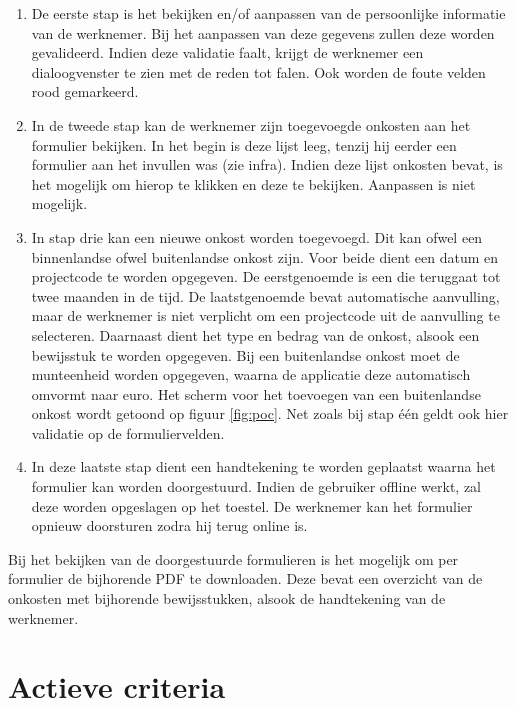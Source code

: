 \begin{enumerate}
\item De eerste stap is het bekijken en/of aanpassen van de persoonlijke informatie van de werknemer.
Bij het aanpassen van deze gegevens zullen deze worden gevalideerd.
Indien deze validatie faalt, krijgt de werknemer een dialoogvenster te zien met de reden tot falen.
Ook worden de foute velden rood gemarkeerd.

\item In de tweede stap kan de werknemer zijn toegevoegde onkosten aan het formulier bekijken.
In het begin is deze lijst leeg, tenzij hij eerder een formulier aan het invullen was (zie infra).
Indien deze lijst onkosten bevat, is het mogelijk om hierop te klikken en deze te bekijken.
Aanpassen is niet mogelijk.

\item In stap drie kan een nieuwe onkost worden toegevoegd.
Dit kan ofwel een binnenlandse ofwel buitenlandse onkost zijn.
Voor beide dient een datum en projectcode te worden opgegeven.
De eerstgenoemde is een  die teruggaat tot twee maanden in de tijd.
De laatstgenoemde bevat automatische aanvulling, maar de werknemer is niet verplicht om een projectcode uit de aanvulling te selecteren.
Daarnaast dient het type en bedrag van de onkost, alsook een bewijsstuk te worden opgegeven.
Bij een buitenlandse onkost moet de munteenheid worden opgegeven, waarna de applicatie deze automatisch omvormt naar euro.
Het scherm voor het toevoegen van een buitenlandse onkost wordt getoond op figuur \ref{fig:poc}. 
Net zoals bij stap één geldt ook hier validatie op de formuliervelden.

\item In deze laatste stap dient een handtekening te worden geplaatst waarna het formulier kan worden doorgestuurd.
Indien de gebruiker offline werkt, zal deze worden opgeslagen op het toestel.
De werknemer kan het formulier opnieuw doorsturen zodra hij terug online is.

\end{enumerate}

Bij het bekijken van de doorgestuurde formulieren is het mogelijk om per formulier de bijhorende PDF te downloaden. 
Deze bevat een overzicht van de onkosten met bijhorende bewijsstukken, alsook de handtekening van de werknemer.

\section{Actieve criteria}
\label{sec:vergelijking-criteria}

